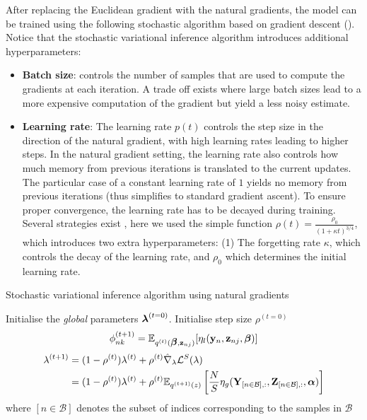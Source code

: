 After replacing the Euclidean gradient with the natural gradients, the model can be trained using the following stochastic algorithm based on gradient descent (). Notice that the stochastic variational inference algorithm introduces additional hyperparameters:

\begin{itemize}
    \item \textbf{Batch size}: controls the number of samples that are used to compute the gradients at each iteration. A trade off exists where large batch sizes lead to a more expensive computation of the gradient but yield a less noisy estimate.

    \item \textbf{Learning rate}: The learning rate $p(t)$ controls the step size in the direction of the natural gradient, with high learning rates leading to higher steps. In the natural gradient setting, the learning rate also controls how much memory from previous iterations is translated to the current updates. The particular case of a constant learning rate of $1$ yields no memory from previous iterations (thus simplifies to standard gradient ascent). To ensure proper convergence, the learning rate has to be decayed during training. Several strategies exist \cite{Ranganath2013}, here we used the simple function $\rho(t) = \frac{\rho_0}{(1 + \kappa t)^{3/4}}$, which introduces two extra hyperparameters: (1) The forgetting rate $\kappa$, which controls the decay of the learning rate, and $\rho_0$ which determines the initial learning rate.

\end{itemize}

\begin{algorithm}
  \caption{Stochastic variational inference algorithm using natural gradients}\label{algorithm:svi}
  \begin{algorithmic}[1]
	\State Initialise the \textit{global} parameters $\mbox{\boldmath $\lambda$}^{(t=0)}$.
	\State Initialise step size $\rho^{(t=0)}$
	\Repeat
	    \State {}
			\State $$ \phi_{nk}^{(t+1)} = \mathbb{E}_{q^{(t)}(\mbox{\boldmath $\beta$},{\bf z}_{nj})}[\eta_l({\bf y}_{n},{\bf z}_{nj},\mbox{\boldmath $\beta$})] $$
      	\EndFor
		     \State
        		\begin{align*} \begin{split}
            	\lambda^{(t + 1)} &=  (1-\rho ^{(t)})\lambda^{(t)} +  \rho ^{(t)} \hat{\nabla}_{\lambda} \mathcal{L}^S(\lambda) \\
            	 &=  (1-\rho ^{(t)})\lambda^{(t)} +  \rho ^{(t)} \mathbb{E}_{q^{(t+1)}(z)}\left[\frac{N}{S}\eta_g({\bf Y}_{[n \in \mathcal{B}],:},{\bf Z}_{[n \in \mathcal{B}],:},\mbox{\boldmath $\alpha$})\right]
            \end{split} \end{align*}
            \State where $[n \in \mathcal{B}]$ denotes the subset of indices corresponding to the samples in $\mathcal{B}$
      	\EndFor
	\end{algorithmic}
\end{algorithm}

